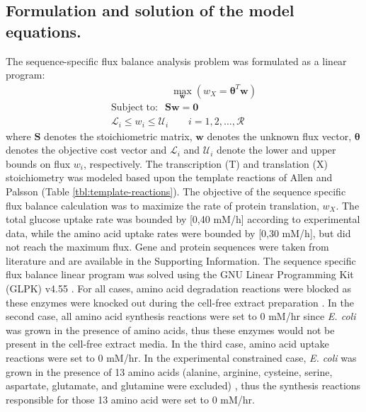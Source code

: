 \documentclass[journal=asbcd6,manuscript=article]{achemso}
\begin{document}
\subsection*{Formulation and solution of the model equations.}
The sequence-specific flux balance analysis problem was formulated as a linear program:
\begin{equation}
 \begin{multlined}
	\qquad \qquad \qquad \max_{\boldsymbol{w}}{} \! \left( w_{X} = \mathbf{\boldsymbol{\theta}}^T \boldsymbol{w} \right) \\
	\mathrm{Subject \; to:}
	 \; \; \mathbf{S}\mathbf{w}=\mathbf{0} \\
\mathcal{L}_{i} \leq w_i \leq \mathcal{U}_{i}  \qquad i=1,2,\hdots,\mathcal{R}
 \end{multlined}
\end{equation}
where $\mathbf{S}$ denotes the stoichiometric matrix, $\mathbf{w}$ denotes the unknown flux vector, $\boldsymbol{\theta}$ denotes the objective cost vector
and $\mathcal{L}_{i}$ and $\mathcal{U}_{i}$ denote the lower and upper bounds on flux $w_{i}$, respectively.
The transcription (T) and translation (X) stoichiometry was modeled based upon the template reactions of Allen and Palsson \cite{Allen:2003aa} (Table \ref{tbl:template-reactions}).
The objective of the sequence specific flux balance calculation was to maximize the rate of protein translation, $w_{X}$.
The total glucose uptake rate was bounded by [0,40 mM/h] according to experimental data, while the amino acid uptake rates were bounded by [0,30 mM/h], but did not reach the maximum flux.
Gene and protein sequences were taken from literature and are available in the Supporting Information.
The sequence specific flux balance linear program was solved using the GNU Linear Programming Kit (GLPK) v4.55 \cite{GLPK}.
For all cases, amino acid degradation reactions were blocked as these enzymes were knocked out during the cell-free extract preparation \cite{2005_calhoun_BiotechnologyProgress, Garamella:2016aa}.
In the second case, all amino acid synthesis reactions were set to 0 mM/hr since \textit{E. coli} was grown in the presence of amino acids, thus these enzymes would not be present in the cell-free extract media.
In the third case, amino acid uptake reactions were set to 0 mM/hr.
In the experimental constrained case, \textit{E. coli} was grown in the presence of 13 amino acids (alanine, arginine, cysteine, serine, aspartate, glutamate, and glutamine were excluded) \cite{Zawada:2003}, thus the synthesis reactions responsible for those 13 amino acid were set to 0 mM/hr.
\end{document}
